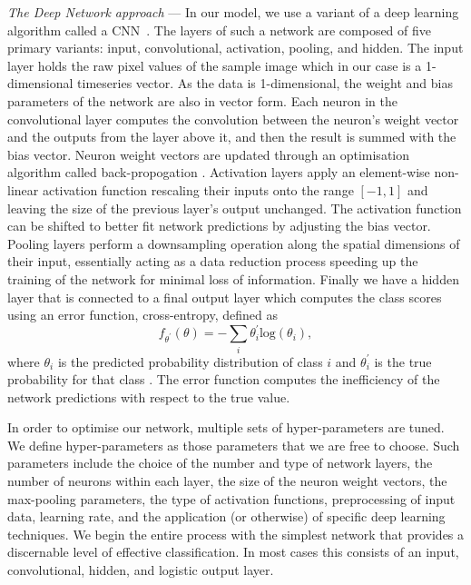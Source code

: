 \documentclass[%
showpacs,
 amsmath,amssymb,
 aps,
 twocolumn,
 prl,
 reprint,
floatfix,
]{revtex4-1}
\begin{document}
%
% 
\textit{The Deep Network approach} --- 
%
%
In our model, we use a variant of a deep learning algorithm called a
\ac{CNN}~\cite{726791}. The layers of such a network are composed of five
primary variants: input, convolutional, activation, pooling, and
hidden. The input layer holds the raw pixel values of the sample
image which in our case is a 1-dimensional timeseries vector. As the data is 1-dimensional, the weight and bias parameters of the network are also in vector form. Each neuron in the convolutional layer computes the convolution between the neuron's weight vector and the outputs from the layer above it, and then the result is summed with the bias vector. Neuron weight vectors are updated through an optimisation algorithm called back-propogation \cite{LeCun1998}. 
Activation layers apply an element-wise non-linear activation function rescaling
their inputs onto the range $[-1,1]$ and leaving the size of the previous
layer's output unchanged. The activation function can be shifted to better fit network predictions by adjusting the bias vector. 
Pooling layers perform a downsampling operation along
the spatial dimensions of their input, essentially acting as a data reduction
process speeding up the training of the network for minimal loss of
information. Finally we have a hidden layer that is connected to a final output layer which
computes the class scores using an error function, cross-entropy, defined as
%
%
\begin{equation} \label{eq:loss}
f_{\theta^{'}}(\theta) = -\sum_{i} \theta_{i}^{'} \mathrm{log}(\theta_{i}),
\end{equation}
%
where $\theta_{i}$ is the predicted probability distribution of class $i$ and
$\theta_{i}^{'}$ is the true probability for that class
\cite{tensorflow2015-whitepaper}. The error function computes the inefficiency of
the network predictions with respect to the true value. 

%
%
In order to optimise our network, multiple sets of hyper-parameters are
tuned. We define hyper-parameters as those parameters that we are free to
choose. Such parameters include the choice of the number and type of network
layers, the number of neurons within each layer, the size of the neuron weight vectors, the max-pooling
parameters, the type of activation functions, preprocessing of input data,
 learning rate, and the application (or otherwise) of specific deep learning techniques. We begin
the entire process with the simplest network that provides a discernable level
of effective classification. In most cases this consists of an input,
convolutional, hidden, and logistic output layer.
\end{document}
